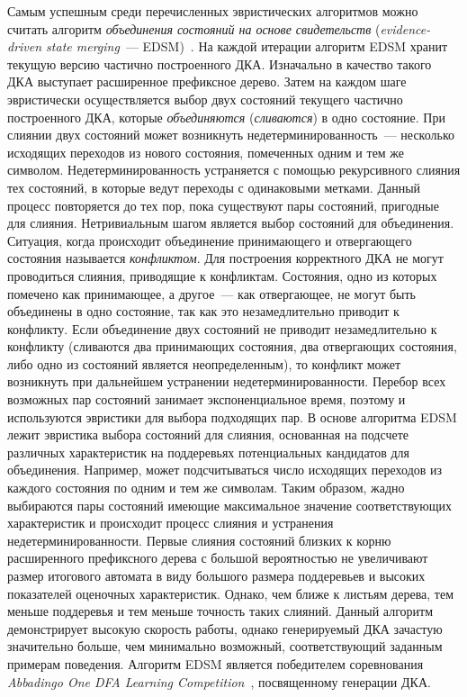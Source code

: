 Самым успешным среди перечисленных эвристических алгоритмов можно считать алгоритм \emph{объединения состояний на основе свидетельств} (\emph{evidence-driven state merging}~--- EDSM)~\cite{DBLP:conf/icgi/LangPP98}.
На каждой итерации алгоритм EDSM хранит текущую версию частично построенного ДКА.
Изначально в качество такого ДКА выступает расширенное префиксное дерево.
Затем на каждом шаге эвристически осуществляется выбор двух состояний текущего частично построенного ДКА, которые \emph{объединяются} (\emph{сливаются}) в одно состояние.
При слиянии двух состояний может возникнуть недетерминированность~--- несколько исходящих переходов из нового состояния, помеченных одним и тем же символом.
Недетерминированность устраняется с помощью рекурсивного слияния тех состояний, в которые ведут переходы с одинаковыми метками.
Данный процесс повторяется до тех пор, пока существуют пары состояний, пригодные для слияния. 
Нетривиальным шагом является выбор состояний для объединения.
Ситуация, когда происходит объединение принимающего и отвергающего состояния называется \emph{конфликтом}.
Для построения корректного ДКА не могут проводиться слияния, приводящие к конфликтам.
Состояния, одно из которых помечено как принимающее, а другое~--- как отвергающее, не могут быть объединены в одно состояние, так как это незамедлительно приводит к конфликту.
Если объединение двух состояний не приводит незамедлительно к конфликту (сливаются два принимающих состояния, два отвергающих состояния, либо одно из состояний является неопределенным), то конфликт может возникнуть при дальнейшем устранении недетерминированности.
Перебор всех возможных пар состояний занимает экспоненциальное время, поэтому и используются эвристики для выбора подходящих пар.
В основе алгоритма EDSM лежит эвристика выбора состояний для слияния, основанная на подсчете различных характеристик на поддеревьях потенциальных кандидатов для объединения.
Например, может подсчитываться число исходящих переходов из каждого состояния по одним и тем же символам.
Таким образом, жадно выбираются пары состояний имеющие максимальное значение соответствующих характеристик и происходит процесс слияния и устранения недетерминированности.
Первые слияния состояний близких к корню расширенного префиксного дерева с большой вероятностью не увеличивают размер итогового автомата в виду большого размера поддеревьев и высоких показателей оценочных характеристик.
Однако, чем ближе к листьям дерева, тем меньше поддеревья и тем меньше точность таких слияний.
Данный алгоритм демонстрирует высокую скорость работы, однако генерируемый ДКА зачастую значительно больше, чем минимально возможный, соответствующий заданным примерам поведения.
Алгоритм EDSM является победителем соревнования \emph{Abbadingo One DFA Learning Competition}~\cite{DBLP:conf/icgi/LangPP98}, посвященному генерации ДКА.


